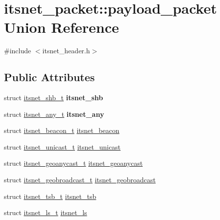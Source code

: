 \hypertarget{unionitsnet__packet_1_1payload__packet}{\section{itsnet\-\_\-packet\-:\-:payload\-\_\-packet \-Union \-Reference}
\label{unionitsnet__packet_1_1payload__packet}
}


{\ttfamily \#include $<$itsnet\-\_\-header.\-h$>$}

\subsection*{\-Public \-Attributes}
\begin{DoxyCompactItemize}
\item 
\hypertarget{unionitsnet__packet_1_1payload__packet_ad8d2e49ea0455be6b486c486b17418a4}{struct \hyperlink{structitsnet__shb__t}{itsnet\-\_\-shb\-\_\-t} {\bfseries itsnet\-\_\-shb}}\label{unionitsnet__packet_1_1payload__packet_ad8d2e49ea0455be6b486c486b17418a4}

\item 
\hypertarget{unionitsnet__packet_1_1payload__packet_aac28f6f0f5a4d31cdfd3fc79c6495ebb}{struct \hyperlink{structitsnet__any__t}{itsnet\-\_\-any\-\_\-t} {\bfseries itsnet\-\_\-any}}\label{unionitsnet__packet_1_1payload__packet_aac28f6f0f5a4d31cdfd3fc79c6495ebb}

\item 
struct \hyperlink{structitsnet__beacon__t}{itsnet\-\_\-beacon\-\_\-t} \hyperlink{unionitsnet__packet_1_1payload__packet_a8bc8f430f8f46b9cee9b118b7131bca1}{itsnet\-\_\-beacon}
\item 
struct \hyperlink{structitsnet__unicast__t}{itsnet\-\_\-unicast\-\_\-t} \hyperlink{unionitsnet__packet_1_1payload__packet_a18392dccee1c690a56a5e86af985a5a2}{itsnet\-\_\-unicast}
\item 
struct \hyperlink{structitsnet__geoanycast__t}{itsnet\-\_\-geoanycast\-\_\-t} \hyperlink{unionitsnet__packet_1_1payload__packet_a2d16b9d7f7229021de254d8f339f169b}{itsnet\-\_\-geoanycast}
\item 
struct \hyperlink{structitsnet__geobroadcast__t}{itsnet\-\_\-geobroadcast\-\_\-t} \hyperlink{unionitsnet__packet_1_1payload__packet_aff53cbb7dee96834ac86a8b67858afd8}{itsnet\-\_\-geobroadcast}
\item 
struct \hyperlink{structitsnet__tsb__t}{itsnet\-\_\-tsb\-\_\-t} \hyperlink{unionitsnet__packet_1_1payload__packet_aaceedda6aa677f9c47fadac0eee8231f}{itsnet\-\_\-tsb}
\item 
struct \hyperlink{structitsnet__ls__t}{itsnet\-\_\-ls\-\_\-t} \hyperlink{unionitsnet__packet_1_1payload__packet_abd7c6c7582fe551f1fbd6e40ed451576}{itsnet\-\_\-ls}
\end{DoxyCompactItemize}


